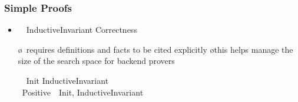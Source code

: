 \documentclass[fleqn]{beamer}
\begin{document}
\begin{frame}
  \frametitle{Simple Proofs}

  \begin{itemize}
  \item {}

    \medskip

    \qquad\begin{tlablock}
      \LEMMA\ \ InductiveInvariant \implies Correctness\\
    \end{tlablock}

\pause



    \begin{itemize}
    \o \tlaps\ requires definitions and facts to be cited explicitly
    \o this helps manage the size of the search space for backend provers
    \end{itemize}

\pause
  \oo {}

    \medskip

    \qquad\begin{tlablock}
      \LEMMA\ \ Init \implies InductiveInvariant\\
      \BY\ Positive\ \DEFS\ Init, InductiveInvariant
    \end{tlablock}

  \oo {}
  \end{itemize}
  
\end{frame}
\end{document}
